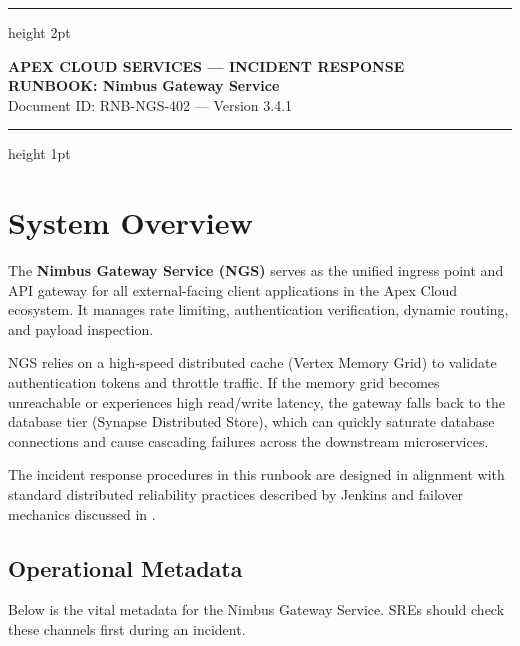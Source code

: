 \begin{center}
    \sffamily
    \color{primary}
    \hrule height 2pt
    \vspace{1em}
    \begin{minipage}{0.15\textwidth}
        \centering
    \end{minipage}%
    \hfill
    \begin{minipage}{0.80\textwidth}
        {\sffamily\bfseries\large\color{accent} APEX CLOUD SERVICES --- INCIDENT RESPONSE} \\
        \vspace{0.2em}
        {\sffamily\Huge\bfseries RUNBOOK: Nimbus Gateway Service} \\
        \vspace{0.3em}
        {\sffamily\large\color{slate600} Document ID: RNB-NGS-402 --- Version 3.4.1}
    \end{minipage}
    \vspace{1.5em}
    \hrule height 1pt
\end{center}

\vspace{1.5em}

\section{System Overview}
\label{sec:overview}
The \textbf{Nimbus Gateway Service (NGS)} serves as the unified ingress point and API gateway for all external-facing client applications in the Apex Cloud ecosystem. It manages rate limiting, authentication verification, dynamic routing, and payload inspection.

NGS relies on a high-speed distributed cache (Vertex Memory Grid) to validate authentication tokens and throttle traffic. If the memory grid becomes unreachable or experiences high read/write latency, the gateway falls back to the database tier (Synapse Distributed Store), which can quickly saturate database connections and cause cascading failures across the downstream microservices.

The incident response procedures in this runbook are designed in alignment with standard distributed reliability practices described by Jenkins \cite{jenkins2024distributed} and failover mechanics discussed in \cite{rostova2025failover}.

\subsection{Operational Metadata}
Below is the vital metadata for the Nimbus Gateway Service. SREs should check these channels first during an incident.

